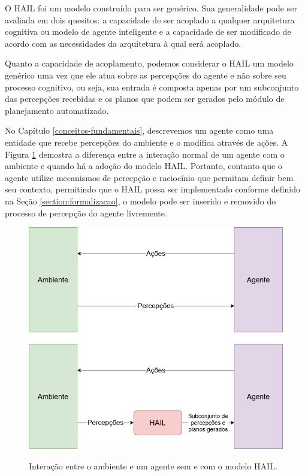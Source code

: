 O HAIL foi um modelo construído para ser genérico. Sua generalidade pode ser avaliada em dois quesitos: a capacidade de ser acoplado a qualquer arquitetura cognitiva ou modelo de agente inteligente e a capacidade de ser modificado de acordo com as necessidades da arquitetura à qual será acoplado.

Quanto a capacidade de acoplamento, podemos considerar o HAIL um modelo genérico uma vez que ele atua sobre as percepções do agente e não sobre seu processo cognitivo, ou seja, sua entrada é composta apenas por um subconjunto das percepções recebidas e os planos que podem ser gerados pelo módulo de planejamento automatizado. 

No Capítulo \ref{conceitos-fundamentais}, descrevemos um agente como uma entidade que recebe percepções do ambiente e o modifica através de ações. A Figura \ref{fig:generalidade} demostra a diferença entre a interação normal de um agente com o ambiente e quando há a adoção do modelo HAIL. Portanto, contanto que o agente utilize mecanismos de percepção e raciocínio que permitam definir bem seu contexto, permitindo que o HAIL possa ser implementado conforme definido na Seção \ref{section:formalizacao}, o modelo pode ser inserido e removido do processo de percepção do agente livremente.

\begin{figure}
    \centering
    \caption{Interação entre o ambiente e um agente sem e com o modelo HAIL.}
    \includegraphics[width=\textwidth]{images/generalidade.png}
    \label{fig:generalidade}
\end{figure}

